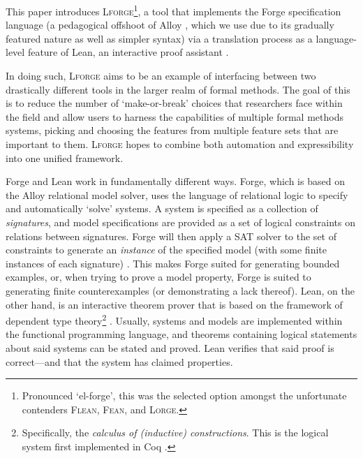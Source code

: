 This paper introduces \textsc{Lforge}\footnote{Pronounced `el-forge', this was the selected option amongst the unfortunate contenders \textsc{Flean}, \textsc{Fean}, and \textsc{Lorge}.}, a tool that implements the Forge specification language \cite{ngpdbccdlrrvwwk-oopsla-2024} (a pedagogical offshoot of Alloy \cite{jackson2012software}, which we use due to its gradually featured nature as well as simpler syntax) via a translation process as a language-level feature of Lean, an interactive proof assistant \cite{moura2021lean}.

In doing such, \textsc{Lforge} aims to be an example of interfacing between two drastically different tools in the larger realm of formal methods. The goal of this is to reduce the number of `make-or-break' choices that researchers face within the field and allow users to harness the capabilities of multiple formal methods systems, picking and choosing the features from multiple feature sets that are important to them. \textsc{Lforge} hopes to combine both automation and expressibility into one unified framework. 

Forge and Lean work in fundamentally different ways. Forge, which is based on the Alloy relational model solver, uses the language of relational logic to specify and automatically `solve' systems. A system is specified as a collection of \emph{signatures}, and model specifications are provided as a set of logical constraints on relations between signatures. Forge will then apply a SAT solver to the set of constraints to generate an \emph{instance} of the specified model (with some finite instances of each signature) \cite{jackson2019alloy,ngpdbccdlrrvwwk-oopsla-2024}. This makes Forge suited for generating bounded examples, or, when trying to prove a model property, Forge is suited to generating finite counterexamples (or demonstrating a lack thereof). Lean, on the other hand, is an interactive theorem prover that is based on the framework of dependent type theory\footnote{Specifically, the \emph{calculus of (inductive) constructions}. This is the logical system first implemented in Coq \cite{bertot2008short}.} \cite{avigad2024theorem}. Usually, systems and models are implemented within the functional programming language, and theorems containing logical statements about said systems can be stated and proved. Lean verifies that said proof is correct---and that the system has claimed properties.

